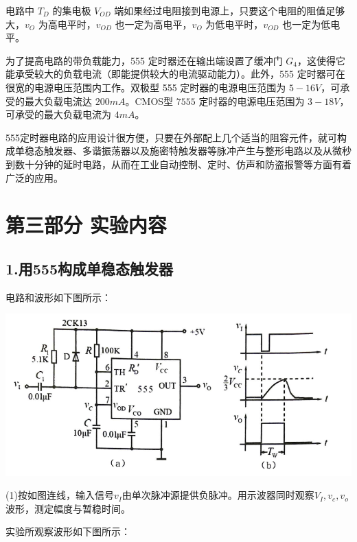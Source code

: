 \documentclass{ctexart}
\begin{document}
电路中 $T_D$ 的集电极 $V_{OD}$ 端如果经过电阻接到电源上，只要这个电阻的阻值足够大，$v_O$ 为高电平时，$v_{OD}$ 也一定为高电平，$v_O$ 为低电平时，$v_{OD}$ 也一定为低电平。

为了提高电路的带负载能力，555 定时器还在输出端设置了缓冲门 $G_4$，这使得它能承受较大的负载电流（即能提供较大的电流驱动能力）。此外，555 定时器可在很宽的电源电压范围内工作。双极型 555 定时器的电源电压范围为 $5-16V$，可承受的最大负载电流达 $200mA$。CMOS型 $7555$ 定时器的电源电压范围为 $3-18V$，可承受的最大负载电流为 $4mA$。

555定时器电路的应用设计很方便，只要在外部配上几个适当的阻容元件，就可构成单稳态触发器、多谐振荡器以及施密特触发器等脉冲产生与整形电路以及从微秒到数十分钟的延时电路，从而在工业自动控制、定时、仿声和防盗报警等方面有着广泛的应用。


\newpage
    \section*{第三部分 \quad 实验内容}
    \subsection*{1.用555构成单稳态触发器}
    电路和波形如下图所示：
    
    \begin{minipage}[c]{\textwidth}
         \centering
         
         \includegraphics[width=\linewidth]{3.1.1.png}
        
    \end{minipage}

    (1)按如图连线，输入信号$v_I$由单次脉冲源提供负脉冲。用示波器同时观察$V_I,v_c,v_o$波形，测定幅度与暂稳时间。

    实验所观察波形如下图所示：
    
\end{document}
